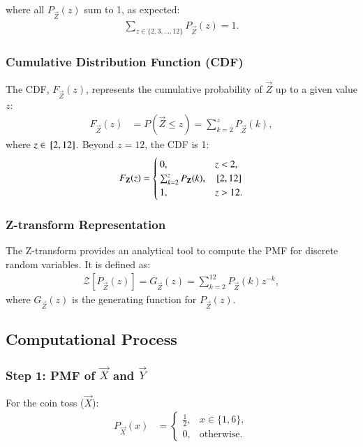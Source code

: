 \documentclass[journal]{IEEEtran}
\begin{document}
\noindent where all $P_{\vec{Z}}(z)$ sum to 1, as expected:
\begin{align}
\sum_{z \in \{2, 3, \dots, 12\}} P_{\vec{Z}}(z) = 1.
\end{align}


\subsubsection*{Cumulative Distribution Function (CDF)}
The CDF, $F_{\vec{Z}}(z)$, represents the cumulative probability of $\vec{Z}$ up to a given value $z$:
\begin{align}
F_{\vec{Z}}(z) &= P(\vec{Z} \leq z) = \sum_{k=2}^{z} P_{\vec{Z}}(k),
\end{align}
where $z \in {}\left[2,12\right]$. Beyond $z = 12$, the CDF is 1:
\begin{align}
F_{\mathbf{Z}}(z) = 
\begin{cases} 
0, & z < 2, \\
\sum_{k=2}^{z} P_{\mathbf{Z}}(k), & {}\left[2,12\right] \\
1, & z > 12.
\end{cases}
\end{align}

\subsubsection*{Z-transform Representation}
The Z-transform provides an analytical tool to compute the PMF for discrete random variables. It is defined as:
\begin{align}
\mathcal{Z}[P_{\vec{Z}}(z)] = G_{\vec{Z}}(z) = \sum_{k=2}^{12} P_{\vec{Z}}(k) z^{-k},
\end{align}
where $G_{\vec{Z}}(z)$ is the generating function for $P_{\vec{Z}}(z)$.

\subsection*{Computational Process}

\subsubsection*{Step 1: PMF of $\vec{X}$ and $\vec{Y}$}
For the coin toss ($\vec{X}$):
\begin{align}
P_{\vec{X}}(x) &= 
\begin{cases} 
\frac{1}{2}, & x \in \{1, 6\}, \\
0, & \text{otherwise}.
\end{cases}
\end{align}
\end{document}
